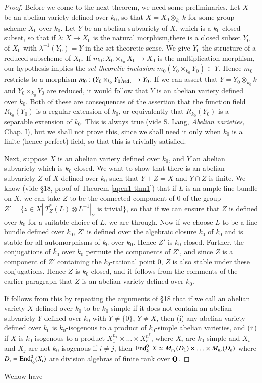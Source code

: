 \begin{proof}
Before we come to the next theorem, we need some preliminaries. Let $X$ be an abelian variety defined over $k_0$, so that $X = X_0 \otimes_{k_0} k$ for some group-scheme $X_0$ over $k_0$. Let $Y$ be an abelian subvariety of $X$, which is a $k_0$-closed subset, so that if $\lambda:X \to X_0$ is the natural morphism,\pageoriginale there is a closed subset $Y_0$ of $X_0$ with $\lambda^{-1}(Y_0) = Y$ in the set-theoretic sense. We give $Y_0$ the structure of a reduced subscheme of $X_0$. If $m_0 : X_0 \times_{k_0} X_0\to X_0$ is the multiplication morphism, our hypothesis implies the {\em set-theoretic inclusion } $m_0 (Y_0 \times_{k_0} Y_0) \subset Y$. Hence $m_0$ restricts to a morphism $m_0 :(Y_0 \times_{k_0} Y_0)_{\operatorname{red}.} \to Y_0$. If we can assert that $Y = Y_0 \otimes_{k_0} k$ and $Y_0 \times_{k_0} Y_0$ are reduced, it would follow that $Y$ is an abelian variety defined over $k_0$. Both of these are consequences of the assertion that the function field $R_{k_0} (Y_0)$ is a regular extension of $k_0$, or equivalently that $R_{k_0} (Y_0)$ is a separable extension of $k_0$. This is always true (vide S. Lang, {\em Abelian varieties,} Chap. I), but we shall not prove this, since we shall need it only when $k_0$ is a finite (hence perfect) field, so that this is trivially satisfied.

Next, suppose $X$ is an abelian variety defined over $k_0$, and $Y$ an abelian subvariety which is $k_0$-closed. We want to show that there is an abelian subvariety $Z$ of $X$ defined over $k_0$ such that $Y + Z = X$ and $Y \cap Z$ is finite. We know (vide \S 18, proof of Theorem \ref{apen1-thm1}) that if $L$ is an ample line bundle on $X$, we can take $Z$ to be the connected component of 0 of the group $Z' = \{z \in X|~ T^*_Z (L) \otimes L^{-1}|_Y \text{ is trivial} \}$, so that if we can ensure that $Z$ is defined over $k_0$ for  a suitable choice of $L$, we are through. Now if we choose $L$ to be a line bundle defined over $k_0$, $Z'$ is defined over the algebraic closure $\bar{k}_0$ of $k_0$ and is stable for all automorphisms of $\bar{k}_0$ over $k_0$. Hence $Z'$ is $k_0$-closed. Further, the conjugations of $\bar{k}_0$ over $k_0$ permute the components of $Z'$, and since $Z$ is a component of $Z'$ containing the $k_0$-rational point $0$, $Z$ is also stable under these conjugations. Hence $Z$ is $k_0$-closed, and it follows from the comments of the earlier paragraph that $Z$ is an abelian variety defined over $k_0$.

If follows from this by repeating the arguments of \S 18 that if we  call an abelian variety $X$ defined over $k_0$ to be $k_0$-simple if it does not contain an abelian subvariety $Y$ defined over $k_0$ with $Y \neq \{0\}$, $Y \neq X$, then (i) any abelian variety defined over $k_0$ is $k_0$-isogenous to a product of $k_0$-simple abelian varieties, and (ii) if $X$ is $k_0$-isogenous to a product $X^{n_1}_1 \times \ldots \times X^{n^r}_r$, where $X_i$ are $k_0$-simple and $X_i$ and $X_j$ are not $k_0$-isogenous if $i \neq j$, then $\operatorname{End}^0_{k_0} X  \simeq M_{n_1} (D_1) \times \ldots \times M_{n_r} (D_k)$ where $D_i =\operatorname{End}^0_{k_0} (X_i)$ are division algebras of finite rank over $\mathbf{Q}$.
\end{proof} 
We\pageoriginale  now have


